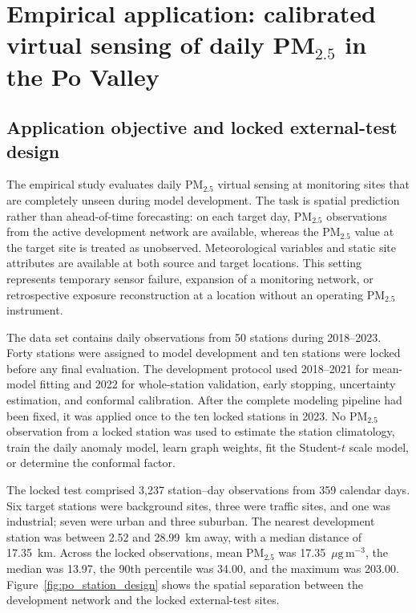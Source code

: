\section{Empirical application: calibrated virtual sensing of daily PM$_{2.5}$ in the Po Valley}
\label{sec:po_application}

\subsection{Application objective and locked external-test design}
\label{subsec:po_design}

The empirical study evaluates daily PM$_{2.5}$ virtual sensing at monitoring sites that are completely unseen during model development. The task is spatial prediction rather than ahead-of-time forecasting: on each target day, PM$_{2.5}$ observations from the active development network are available, whereas the PM$_{2.5}$ value at the target site is treated as unobserved. Meteorological variables and static site attributes are available at both source and target locations. This setting represents temporary sensor failure, expansion of a monitoring network, or retrospective exposure reconstruction at a location without an operating PM$_{2.5}$ instrument.

The data set contains daily observations from 50 stations during 2018--2023. Forty stations were assigned to model development and ten stations were locked before any final evaluation. The development protocol used 2018--2021 for mean-model fitting and 2022 for whole-station validation, early stopping, uncertainty estimation, and conformal calibration. After the complete modeling pipeline had been fixed, it was applied once to the ten locked stations in 2023. No PM$_{2.5}$ observation from a locked station was used to estimate the station climatology, train the daily anomaly model, learn graph weights, fit the Student-$t$ scale model, or determine the conformal factor.

The locked test comprised 3,237 station--day observations from 359 calendar days. Six target stations were background sites, three were traffic sites, and one was industrial; seven were urban and three suburban. The nearest development station was between 2.52 and 28.99~km away, with a median distance of 17.35~km. Across the locked observations, mean PM$_{2.5}$ was 17.35~$\mu\mathrm{g}\,\mathrm{m}^{-3}$, the median was 13.97, the 90th percentile was 34.00, and the maximum was 203.00. Figure~\ref{fig:po_station_design} shows the spatial separation between the development network and the locked external-test sites.

